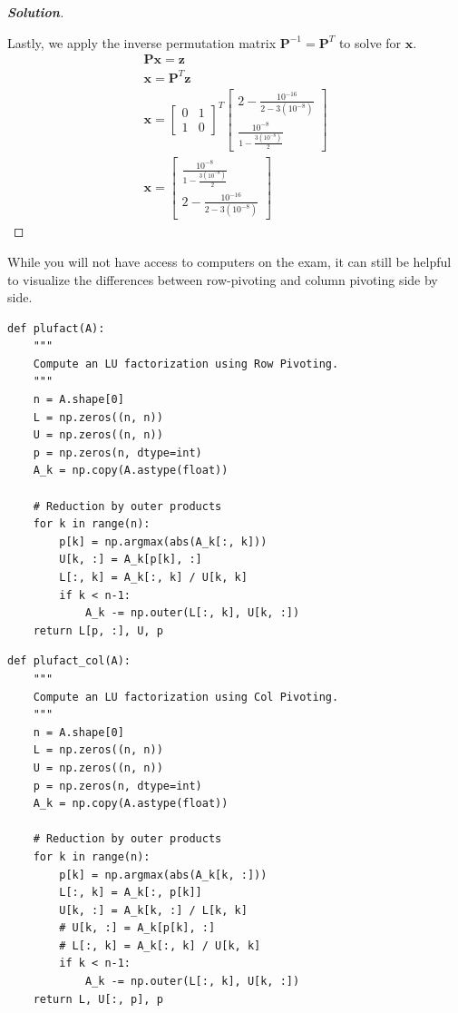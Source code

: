\documentclass[11pt]{article}
\renewcommand{\vec}[1]{\mathbf{#1}}
\newenvironment{solution}{%
  \begin{proof}[\textbf{Solution}]$ $\par\nobreak\ignorespaces
}{%
  \end{proof}
}
\theoremstyle{definition}
\begin{document}
\begin{solution}
Lastly, we apply the inverse permutation matrix $\vec{P}^{-1} = \vec{P}^T$ to solve for $\vec{x}$.
\begin{align*}
    \vec{Px} = \vec{z} \\
    \vec{x} = \vec{P}^{T}\vec{z} \\
    \vec{x} = \begin{bmatrix*}0 & 1 \\ 1 & 0\end{bmatrix*}^T \begin{bmatrix*}2 - \frac{10^{-16}}{2 - 3(10^{-8})} \\ \frac{10^{-8}}{1 - \frac{3(10^{-8})}{2}}\end{bmatrix*} \\
    \vec{x} = \begin{bmatrix*}\frac{10^{-8}}{1 - \frac{3(10^{-8})}{2}} \\ 2 - \frac{10^{-16}}{2 - 3(10^{-8})}\end{bmatrix*}
\end{align*}
\end{solution}

While you will not have access to computers on the exam, it can still be helpful to visualize the differences between row-pivoting and column pivoting side by side.

\begin{lstlisting}[frame=tlrb]
def plufact(A):
    """
    Compute an LU factorization using Row Pivoting.
    """
    n = A.shape[0]
    L = np.zeros((n, n))
    U = np.zeros((n, n))
    p = np.zeros(n, dtype=int)
    A_k = np.copy(A.astype(float))

    # Reduction by outer products
    for k in range(n):
        p[k] = np.argmax(abs(A_k[:, k]))
        U[k, :] = A_k[p[k], :]
        L[:, k] = A_k[:, k] / U[k, k]
        if k < n-1:
            A_k -= np.outer(L[:, k], U[k, :])
    return L[p, :], U, p
\end{lstlisting}
\begin{lstlisting}[frame=tlrb]
def plufact_col(A):
    """
    Compute an LU factorization using Col Pivoting.
    """
    n = A.shape[0]
    L = np.zeros((n, n))
    U = np.zeros((n, n))
    p = np.zeros(n, dtype=int)
    A_k = np.copy(A.astype(float))

    # Reduction by outer products
    for k in range(n):
        p[k] = np.argmax(abs(A_k[k, :]))
        L[:, k] = A_k[:, p[k]]
        U[k, :] = A_k[k, :] / L[k, k]
        # U[k, :] = A_k[p[k], :]
        # L[:, k] = A_k[:, k] / U[k, k]
        if k < n-1:
            A_k -= np.outer(L[:, k], U[k, :])
    return L, U[:, p], p
\end{lstlisting}
\end{document}

